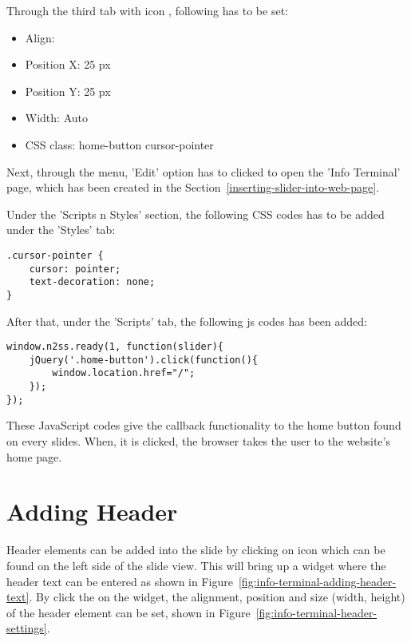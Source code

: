 Through the third tab with icon , following has to be set:
\begin{itemize}
\item Align: 
\item Position X: 25 px
\item Position Y: 25 px
\item Width: Auto
\item CSS class: home-button cursor-pointer
\end{itemize}

Next, through the  menu, 'Edit' option has to clicked to open the 'Info Terminal' page, which has been created in the Section~\ref{inserting-slider-into-web-page}.

Under the 'Scripts n Styles' section, the following CSS codes has to be added under the 'Styles' tab:
\begin{lstlisting}
.cursor-pointer {
	cursor: pointer;
	text-decoration: none;
}
\end{lstlisting}

After that, under the 'Scripts' tab, the following \ac{js} codes has been added:
\begin{lstlisting}
window.n2ss.ready(1, function(slider){
	jQuery('.home-button').click(function(){
		window.location.href="/";
	});
});
\end{lstlisting}

These JavaScript codes give the callback functionality to the home button found on every slides. When, it is clicked, the browser takes the user to the website's home page.

\section{Adding Header} \label{sec:adding-header}
Header elements can be added into the slide by clicking on  icon which can be found on the left side of the slide view. This will bring up a widget where the header text can be entered as shown in Figure~\ref{fig:info-terminal-adding-header-text}. By click the  on the widget, the alignment, position and size (width, height) of the header element can be set, shown in Figure~\ref{fig:info-terminal-header-settings}.

